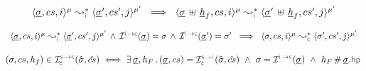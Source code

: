 \begin{theorem}\label{teo:frame:property}
$$
\begin{array}{l}
\transabssemrule{\istate, \cs, i}{\istate', \cs', j}{\mode}{\mode'}{\instrumented} 
       \ \implies \ 
        \transabssemrule{\istate \dunion \iheap_f, \cs, i}{\istate' \dunion \iheap_f, \cs', j}{\mode}{\mode'}{\instrumented} 
\end{array}
$$
\end{theorem}

\begin{lemma}\label{lemma:instrumented:semantics}
$$
\begin{array}{l}
\transabssemrule{\istate, \cs, i}{\istate', \cs', j}{\mode}{\mode'}{\instrumented} 
   \, \wedge \, \interpret{\instconc}{}(\istate) =  \jstate
      \, \wedge \, \interpret{\instconc}{}(\istate') =  \jstate'
       \ \implies \ 
        \transabssemrule{\jstate, \cs, i}{\jstate', \cs', j}{\mode}{\mode'}{\concrete} 
\end{array}
$$
\end{lemma}



\begin{lemma}\label{lemma:symb:interpretation}
$$
(\jstate, \cs, \heap_f) \in \interpret{\symbconc}{\senv}(\sstate, \scs) 
   \iff 
   \exists \, \istate, h_F \, . \, 
         (\istate, \cs) = \interpret{\symbinst}{\senv}(\sstate, \scs)  
          \ \wedge \   
      \jstate = \interpret{\instconc}{}(\istate)
      \ \wedge \
      h_F \disjoint \istate.\hpsel
$$
\end{lemma}

